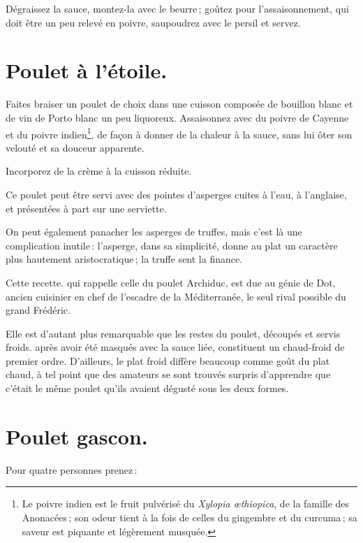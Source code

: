 Dégraissez la sauce, montez-la avec le beurre ; goûtez pour l'assaisonnement,
qui doit être un peu relevé en poivre, saupoudrez avec le persil et servez.

\section*{\centering Poulet à l'étoile.}
{}

Faites braiser un poulet de choix dans une cuisson composée de bouillon blanc
et de vin de Porto blanc un peu liquoreux. Assaisonnez avec du poivre de
Cayenne et du poivre indien\footnote{Le poivre indien est le fruit pulvérisé du
\textit{Xylopia œthiopica}, de la famille des Anonacées ; son odeur tient à la
fois de celles du gingembre et du curcuma ; sa saveur est piquante et
légèrement musquée.}, de façon à donner de la chaleur à la sauce, sans lui ôter
son velouté et sa douceur apparente.

Incorporez de la crème à la cuisson réduite.

Ce poulet peut être servi avec des pointes d’asperges cuites à l'eau,
à l'anglaise, et présentées à part sur une serviette.

On peut également panacher les asperges de truffes, mais c'est là une
complication inutile : l'asperge, dans sa simplicité, donne au plat un
caractère plus hautement aristocratique ; la truffe sent la finance.

Cette recette. qui rappelle celle du poulet Archiduc, est due au génie de Dot,
ancien cuisinier en chef de l'escadre de la Méditerranée, le seul rival
possible du grand Frédéric.

Elle est d'autant plus remarquable que les restes du poulet, découpés et servis
froids. après avoir été masqués avec la sauce liée, constituent un chaud-froid
de premier ordre. D'ailleurs, le plat froid diffère beaucoup comme goût du plat
chaud, à tel point que des amateurs se sont trouvés surpris d'apprendre que
c'était le même poulet qu'ils avaient dégusté sous les deux formes.

\section*{\centering Poulet gascon.}
{}

Pour quatre personnes prenez :

